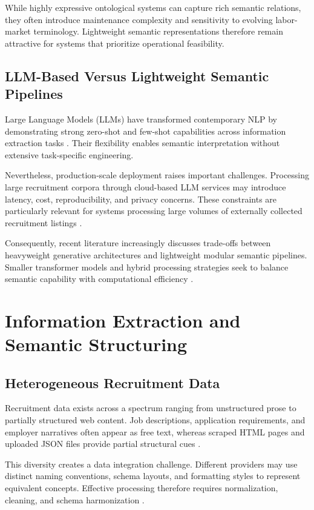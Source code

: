 While highly expressive ontological systems can capture rich semantic relations, they often introduce maintenance complexity and sensitivity to evolving labor-market terminology. Lightweight semantic representations therefore remain attractive for systems that prioritize operational feasibility.

\subsection{LLM-Based Versus Lightweight Semantic Pipelines}

Large Language Models (LLMs) have transformed contemporary NLP by demonstrating strong zero-shot and few-shot capabilities across information extraction tasks \cite{brown2020language, devlin2019bert}. Their flexibility enables semantic interpretation without extensive task-specific engineering.

Nevertheless, production-scale deployment raises important challenges. Processing large recruitment corpora through cloud-based LLM services may introduce latency, cost, reproducibility, and privacy concerns. These constraints are particularly relevant for systems processing large volumes of externally collected recruitment listings \cite{bender2021dangers}.

Consequently, recent literature increasingly discusses trade-offs between heavyweight generative architectures and lightweight modular semantic pipelines. Smaller transformer models and hybrid processing strategies seek to balance semantic capability with computational efficiency \cite{menghani2023efficient, schwartz2020green}.

\section{Information Extraction and Semantic Structuring}

\subsection{Heterogeneous Recruitment Data}

Recruitment data exists across a spectrum ranging from unstructured prose to partially structured web content. Job descriptions, application requirements, and employer narratives often appear as free text, whereas scraped HTML pages and uploaded JSON files provide partial structural cues \cite{abiteboul1997querying, doan2012principles}.

This diversity creates a data integration challenge. Different providers may use distinct naming conventions, schema layouts, and formatting styles to represent equivalent concepts. Effective processing therefore requires normalization, cleaning, and schema harmonization \cite{chu2016data}.

